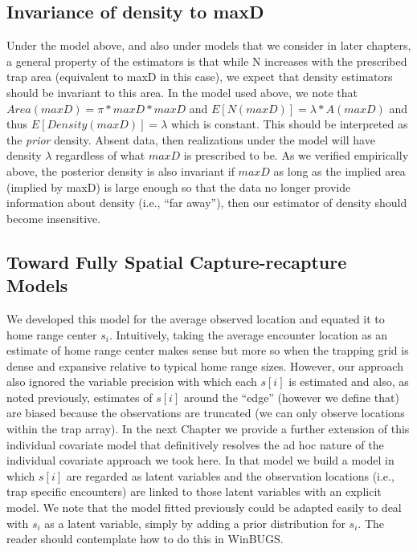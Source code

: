 \subsection{Invariance of density to maxD} 

Under the model above, and also under models that we consider in later chapters, a general property of the estimators is that while N increases with the prescribed trap area (equivalent to maxD in this case), we expect that density estimators should be invariant to this area. In the model used above, we note that 
$Area(maxD) = \pi*maxD*maxD$ and $E[N(maxD)] = \lambda*A(maxD)$ and thus $E[Density(maxD)] = \lambda$  which is constant. This should be interpreted as the {\it prior} density. Absent data, then realizations under the model will have density $\lambda$ regardless of what $maxD$ is prescribed to be.  As we verified empirically above, the posterior density is also invariant if $maxD$ as long as the implied area (implied by maxD) is large enough so that the data no longer provide information about density (i.e., ``far away''), then our estimator of density should become insensitive. 

\subsection{Toward Fully Spatial Capture-recapture Models}
We developed this model for the average observed location and equated it to home range center $s_{i}$. Intuitively, taking the average encounter location as an estimate of home range center makes sense but more so when the trapping grid is dense and expansive relative to typical home range sizes.  However, our approach also ignored  the variable precision with which each $s[i]$ is estimated and also, as noted previously, estimates of $s[i]$ around the ``edge'' (however we define that) are biased because the observations are truncated (we can only observe locations within the trap array).  In the next Chapter we provide a further extension of this individual covariate model that definitively resolves the ad hoc nature of the individual covariate approach we took here. In that model we build a model in which $s[i]$ are regarded as latent variables and the observation locations (i.e., trap specific encounters) are linked to those latent variables with an explicit model. We note that the model fitted previously could be adapted easily to deal with $s_{i}$ as a latent variable, simply by adding a prior distribution for $s_{i}$. The reader should contemplate how to do this in WinBUGS. 


